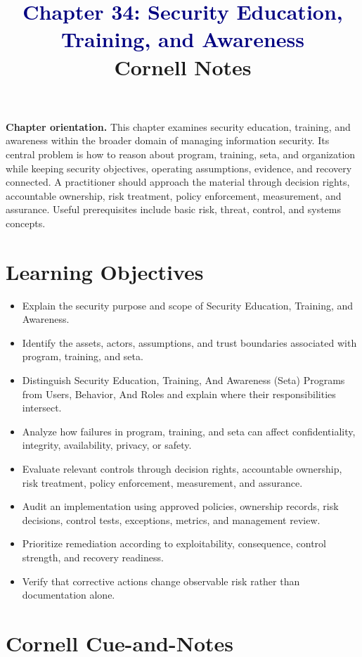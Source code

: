 \documentclass[11pt]{article}
\title{\textcolor{Navy}{Chapter 34: Security Education, Training, and Awareness}\\[2mm]\large Cornell Notes}
\author{}
\date{}
\begin{document}
\maketitle
\thispagestyle{fancy}
\vspace{-1.5em}
\begin{orientationbox}
\textbf{Chapter orientation.} This chapter examines security education, training, and awareness within the broader domain of managing information security. Its central problem is how to reason about program, training, seta, and organization while keeping security objectives, operating assumptions, evidence, and recovery connected. A practitioner should approach the material through decision rights, accountable ownership, risk treatment, policy enforcement, measurement, and assurance. Useful prerequisites include basic risk, threat, control, and systems concepts.
\end{orientationbox}
\section*{Learning Objectives}
\begin{itemize}
\item Explain the security purpose and scope of Security Education, Training, and Awareness.
\item Identify the assets, actors, assumptions, and trust boundaries associated with program, training, and seta.
\item Distinguish Security Education, Training, And Awareness (Seta) Programs from Users, Behavior, And Roles and explain where their responsibilities intersect.
\item Analyze how failures in program, training, and seta can affect confidentiality, integrity, availability, privacy, or safety.
\item Evaluate relevant controls through decision rights, accountable ownership, risk treatment, policy enforcement, measurement, and assurance.
\item Audit an implementation using approved policies, ownership records, risk decisions, control tests, exceptions, metrics, and management review.
\item Prioritize remediation according to exploitability, consequence, control strength, and recovery readiness.
\item Verify that corrective actions change observable risk rather than documentation alone.
\end{itemize}
\section*{Cornell Cue-and-Notes}
\end{document}
